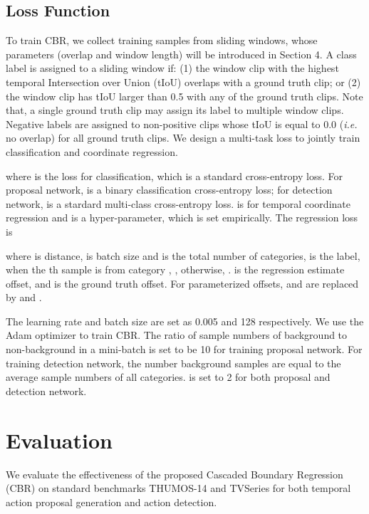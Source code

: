 \documentclass{bmvc2k}
\begin{document}
\subsection{Loss Function}
To train CBR, we collect training samples from sliding windows, whose parameters (overlap and window length) will be introduced in Section 4. A class label is assigned to a sliding window if: (1) the window clip with the highest temporal Intersection over Union (tIoU) overlaps with a ground truth clip; or (2) the window clip has tIoU larger than 0.5 with any of the ground truth clips. Note that, a single ground truth clip may assign its label to multiple window clips. Negative labels are assigned to non-positive clips whose tIoU is equal to 0.0 (\emph{i.e.} no overlap) for all ground truth clips. We design a multi-task loss  to jointly train classification and coordinate regression.

where  is the loss for classification, which is a standard cross-entropy loss. For proposal network,  is a binary classification cross-entropy loss; for detection network,  is a stardard multi-class cross-entropy loss.  is for temporal coordinate regression and  is a hyper-parameter, which is set empirically. The regression loss is 

where  is  distance,  is batch size and  is the total number of categories,  is the label, when the th sample is from category , , otherwise, .  is the regression estimate offset, and  is the ground truth offset. For parameterized offsets,  and  are replaced by  and . 

The learning rate and batch size are set as 0.005 and 128 respectively. We use the Adam \cite{kingma2014adam} optimizer to train CBR. The ratio of sample numbers of background to non-background in a mini-batch is set to be 10 for training proposal network. For training detection network, the number background samples are equal to the average sample numbers of all categories.  is set to 2 for both proposal and detection network. 



\section{Evaluation}
We evaluate the effectiveness of the proposed Cascaded Boundary Regression (CBR) on standard benchmarks THUMOS-14 and TVSeries for both temporal action proposal generation and action detection. 
\end{document}
